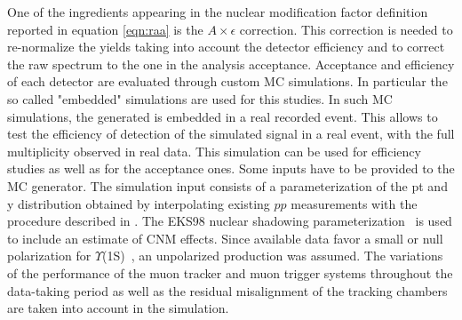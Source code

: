One of the ingredients appearing in the nuclear modification factor definition reported in equation \ref{eqn:raa} is the $A\times\epsilon$ correction.
This correction is needed to re-normalize the \upsi yields taking into account the detector efficiency and to correct the raw spectrum to the one in the analysis acceptance.
Acceptance and efficiency of each detector are evaluated through custom MC simulations.
In particular the so called "embedded" simulations are used for this studies.
In such MC simulations, the generated \upsi is embedded in a real recorded event.
This allows to test the efficiency of detection of the simulated signal in a real event, with the full multiplicity observed in real data.
This simulation can be used for efficiency studies as well as for the acceptance ones.
Some inputs have to be provided to the MC generator.
The simulation input consists of a parameterization of the pt and y distribution obtained by interpolating existing $pp$ measurements \cite{Acosta:2001gv,LHCb:2012aa,Khachatryan:2010zg} with the procedure described in \cite{Bossu:2011qe}.
The EKS98 nuclear shadowing parameterization~\cite{Eskola:1998df} is used to include an estimate of CNM effects.
Since available data favor a small or null polarization for $\Upsilon$(1S)~\cite{Abazov:2008aa,CDF:2011ag,Chatrchyan:2012woa}, an unpolarized production was assumed. 
The variations of the performance of the muon tracker and muon trigger systems throughout the data-taking period as well as the residual misalignment of the tracking chambers are taken into account in the simulation.

